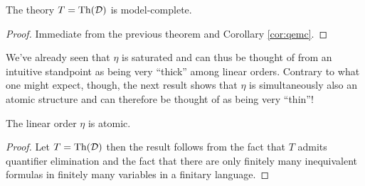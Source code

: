 \begin{cor}
	The theory $T=\operatorname{Th}(\mathcal{D})$ is model-complete.
\end{cor}
\begin{proof}
	Immediate from the previous theorem and Corollary \ref{cor:qemc}.
\end{proof}

We've already seen that $\eta$ is saturated and can thus be thought of from an intuitive standpoint as being very ``thick'' among linear orders.  Contrary to what one might expect, though, the next result shows that $\eta$ is simultaneously also an atomic structure and can therefore be thought of as being very ``thin''!

\begin{prp}
	The linear order $\eta$ is atomic.
\end{prp}
\begin{proof}
	Let $T=\operatorname{Th}(\mathcal{D})$ then the result follows from the fact that $T$ admits quantifier elimination and the fact that there are only finitely many inequivalent formulas in finitely many variables in a finitary language.
\end{proof}
